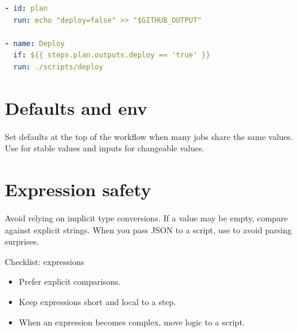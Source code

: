 \begin{lstlisting}[language=YAML]
- id: plan
  run: echo "deploy=false" >> "$GITHUB_OUTPUT"

- name: Deploy
  if: ${{ steps.plan.outputs.deploy == 'true' }}
  run: ./scripts/deploy
\end{lstlisting}

\section{Defaults and env}
Set defaults at the top of the workflow when many jobs share the same values.
Use  for stable values and inputs for changeable values.

\section{Expression safety}
Avoid relying on implicit type conversions.
If a value may be empty, compare against explicit strings.
When you pass JSON to a script, use  to avoid parsing surprises.

\begin{checklistbox}{Checklist: expressions}
\begin{itemize}[nosep]
  \item Prefer explicit comparisons.
  \item Keep expressions short and local to a step.
  \item When an expression becomes complex, move logic to a script.
\end{itemize}
\end{checklistbox}
